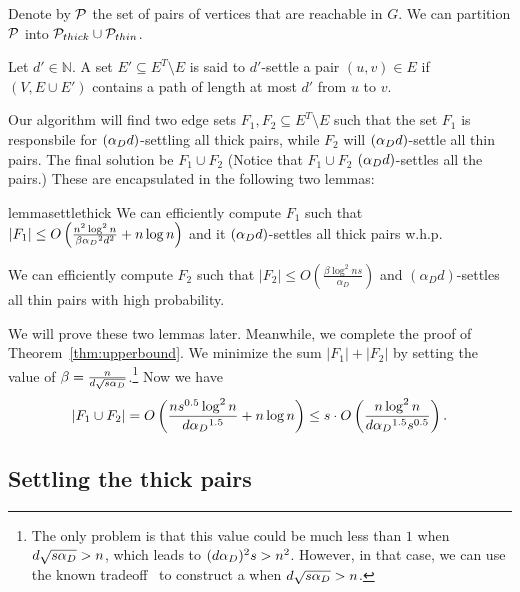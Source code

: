 Denote by $\mathcal{P}$ the set of pairs of vertices that are reachable in $G$. We can partition $\mathcal{P}$ into $\mathcal{P}_{thick} \cup \mathcal{P}_{thin}$. 

\begin{definition}
	Let $d' \in {\mathbb N}$. A set $E'\subseteq E^T \setminus E$ is said to $d'$-settle a pair $(u,v)\in E$ if $(V,E \cup E')$ contains a path of length at most $d'$ from $u$ to $v$. 
\end{definition}


Our algorithm will find two edge sets $F_1,F_2\subseteq E^T \setminus E$ such that the set $F_1$ is responsbile for $(\alpha_D{} d)$-settling all thick pairs, while $F_2$ will $(\alpha_D{} d)$-settle all thin pairs. The final solution be $F_1\cup F_2$ (Notice that $F_1\cup F_2$ $(\alpha_D{} d)$-settles all the pairs.)  These are encapsulated in the following two lemmas: 

\begin{restatable}{lemma}{settlethick}\label{lem:settlethickedges}
We can efficiently compute $F_1$ such that $|F_1| \le O\left(\frac{n^2\log^2 n}{\beta\alpha_D{}^2 d^2}+
n \log n
\right)$ and it $(\alpha_D{} d)$-settles all thick pairs w.h.p. 
\end{restatable}

\begin{lemma} \label{lem:settlethinpairs}
We can efficiently compute $F_2$ such that $|F_2| \leq O\left(\frac{\beta \log^2 n s}{\alpha_D}\right)$ and $(\alpha_D d)$-settles all thin pairs with high probability.      
\end{lemma}

We will prove these two lemmas later. Meanwhile, we complete the proof of Theorem~\ref{thm:upperbound}. 
We minimize the sum $|F_1| + |F_2|$ by setting the value of $\beta=\frac{n}{d\sqrt{s\alpha_D{}}}$.\footnote{The only problem is that this value could be much less than $1$ when $d\sqrt{s\alpha_D{}}>n$, which leads to $(d\alpha_D{})^2s>n^2$. However, in that case,  we can use the known tradeoff~\cite{KoganP22} to construct a  when $d\sqrt{s\alpha_D{}}>n$.} 
	Now we have 
 \[|F_1\cup F_2|=O\left(\frac{ns^{0.5}\log^{2}n}{d\alpha_D{}^{1.5}}+n\log n\right)\le s\cdot O\left(\frac{n\log^{2}n}{d\alpha_D{}^{1.5}s^{0.5}}\right).\]

\subsection{Settling the thick pairs}\label{subsec:thickedges}

